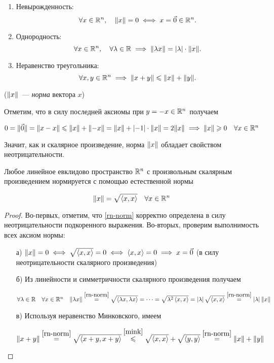 \documentclass[../../main.tex]{subfiles}
\begin{document}
\begin{enumerate}
 \item Невырожденность:
 \[\forall x \in \mathbb{R}^n, \quad \lVert{x}\rVert = 0 \iff x = \vec 0 \in \mathbb{R}^n.\]
 \item Однородность:
 \[\forall x \in \mathbb{R}^n, \quad \forall \lambda \in \mathbb{R} \implies 
   \lVert{\lambda x}\rVert = \left|{\lambda}\right| \cdot \lVert{x}\rVert.\]
 \item Неравенство треугольника:
 \[\forall x, y \in \mathbb{R}^n \implies \lVert{x+y}\rVert \leqslant \lVert{x}\rVert + \lVert{y}\rVert.\]
\end{enumerate}

($\lVert{x}\rVert$~--- \emph{норма} вектора $x$)

\bigskip

Отметим, что в силу последней аксиомы при $y = -x \in \mathbb{R}^n$ получаем

$0 = \lVert{\vec 0}\rVert = \lVert{x - x}\rVert \leqslant \lVert{x}\rVert + \lVert{-x}\rVert =
 \lVert{x}\rVert + \left|{-1}\right| \cdot \lVert{x}\rVert = 2\lVert{x}\rVert \implies \lVert{x}\rVert \geqslant 0
 \quad \forall x \in \mathbb{R}^n$
 
Значит, как и скалярное произведение, норма $\lVert{x}\rVert$ обладает
свойством неотрицательности.

\begin{thm}
 Любое линейное евклидово пространство $\mathbb{R}^n$ с произвольным скалярным
 произведением нормируется с помощью естественной нормы
 
 \begin{equation}
  \label{rn-norm}
  \lVert{x}\rVert = \sqrt{\left<x, x\right>} \quad \forall x \in \mathbb{R}^n
 \end{equation}
 
\end{thm}

\begin{proof}
 Во-первых, отметим, что \eqref{rn-norm} корректно определена в силу 
 неотрицательности подкоренного выражения. Во-вторых, проверим
 выполнимость всех аксиом нормы:
 
 \begin{enumerate}
  \item[а)]
  $\lVert{x}\rVert = 0 \iff \sqrt{\left<x, x\right>} = 0 \iff
  \left<x, x\right> = 0 \implies x = \vec 0$ (в силу 
  неотрицательности скалярного произведения)
  
  \item[б)]
  Из линейности и симметричности скалярного произведения получаем
  
  $\forall \lambda \in \mathbb{R} \quad \forall x \in \mathbb{R}^n \quad
   \lVert{\lambda x}\rVert \stackrel{\eqref{rn-norm}}{=}
   \sqrt{\left<\lambda x, \lambda x\right>} = \dots =
   \sqrt{\lambda^2\left<x, x\right>} =
   \left|{\lambda}\right| \sqrt{\left<x, x\right>} \stackrel{\eqref{rn-norm}}{=}
   \left|{\lambda}\right| \lVert{x}\rVert$
 
  \item[в)]
  Используя неравенство Минковского, имеем
  
  $\lVert{x+y}\rVert \stackrel{\eqref{rn-norm}}{=}
   \sqrt{\left<x+y, x+y\right>} \stackrel{\eqref{mink}}{\leqslant}
   \sqrt{\left<x, x\right>} + \sqrt{\left<y, y\right>}
   \stackrel{\eqref{rn-norm}}{=} \lVert{x}\rVert + \lVert{y}\rVert$
 \end{enumerate}
 
\end{proof}
\end{document}
